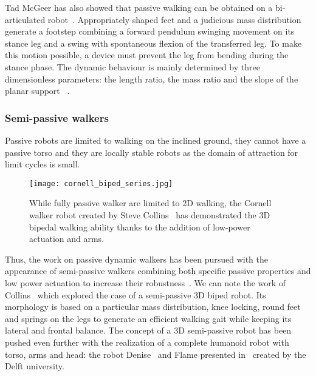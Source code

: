 Tad McGeer has also showed that passive walking can be obtained on a bi-articulated robot~\parencite{mcgeer1992principles}. Appropriately shaped feet  and a judicious mass distribution generate a footstep combining a forward pendulum swinging movement on its stance leg and a swing with spontaneous flexion of the transferred leg. To make this motion possible, a device must prevent the leg from bending during the stance phase.
The dynamic behaviour is mainly determined by three dimensionless parameters: the length ratio, the mass ratio and the slope of the planar support ~\parencite{Garcia1998}.


\subsubsection{Semi-passive walkers} %
Passive robots are limited to walking on the inclined ground, they cannot have a passive torso and they are locally stable robots as the domain of attraction for limit cycles is small.

\begin{figure}[tb]
    \begin{center}
        \texttt{[image: cornell\_biped\_series.jpg]}
    \end{center}
    \caption{While fully passive walker are limited to 2D walking, the Cornell walker robot created by Steve Collins~\parencite{collins2005bipedal} has demonstrated the 3D bipedal walking ability thanks to the addition of low-power actuation and arms. }
    \label{fig:cornell-biped}
\end{figure}

Thus, the work on passive dynamic walkers has been pursued with the appearance of semi-passive walkers combining both specific passive properties and low power actuation to increase their robustness~\parencite{Anderson2005}. We can note the work of Collins~\parencite{collins2005bipedal} which explored the case of a semi-passive 3D biped robot. Its morphology is based on a particular mass distribution, knee locking, round feet and springs on the legs to generate an efficient walking gait while keeping its lateral and frontal balance. The concept of a 3D semi-passive robot has been pushed even further with the realization of a complete humanoid robot with torso, arms and head: the robot Denise~\parencite{wisse2005three} and Flame presented in~\parencite{Hobbelen2008} created by the Delft university.

%


